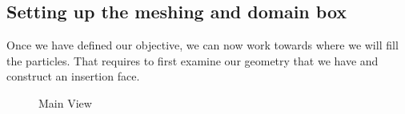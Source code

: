 \documentclass{tufte-book} %
\begin{document}
\subsection{Setting up the meshing and domain box}

Once we have defined our objective, we can now work towards where we will fill the particles. That requires to first examine our geometry that we have and construct an insertion face.
\begin{figure}
  
  \caption{Main View}
  \label{MainView}
\end{figure}
\end{document}
